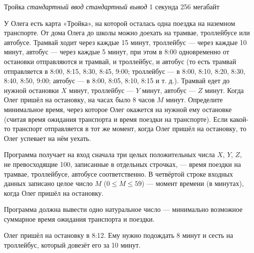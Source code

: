 \begin{problem}%
{Тройка}%
{\textsl{стандартный ввод}}%
{\textsl{стандартный вывод}}%
{1 секунда}%
{256 мегабайт}{}

У Олега есть карта «Тройка», на которой осталась одна поездка на наземном транспорте. От дома Олега до школы можно доехать на трамвае, троллейбусе или автобусе. Трамвай ходит через каждые 15 минут, троллейбус — через каждые 10 минут, автобус — через каждые 5 минут, при этом в 8:00 одновременно от остановки отправляются и трамвай, и троллейбус, и автобус (то есть трамвай отправляется в 8:00, 8:15, 8:30, 8:45, 9:00; троллейбус — в 8:00, 8:10, 8:20, 8:30, 8:40, 8:50, 9:00; автобус — в 8:00, 8:05, 8:10, 8:15 и т. д.). Трамвай едет до нужной остановки $X$ минут, троллейбус — $Y$ минут, автобус — $Z$ минут. Когда Олег пришёл на остановку, на часах было 8 часов $M$ минут. Определите минимальное время, через которое Олег окажется на нужной ему остановке (считая время ожидания транспорта и время поездки на транспорте). Если какой-то транспорт отправляется в тот же момент, когда Олег пришёл на остановку, то Олег успевает на нём уехать.

\InputFile

Программа получает на вход сначала три целых положительных числа $X$, $Y$, $Z$, не превосходящие 100, записанные в отдельных строчках, — время поездки на трамвае, троллейбусе, автобусе соответственно. В четвёртой строке входных данных записано целое число $M$ ($0 \le M \le 59$) — момент времени (в минутах), когда Олег пришёл на остановку.

\OutputFile

Программа должна вывести одно натуральное число — минимально возможное суммарное время ожидания транспорта и поездки.

\Examples

\begin{example}
%
\end{example}

\Explanation

Олег пришёл на остановку в 8:12. Ему нужно подождать 8 минут и сесть на троллейбус, который довезёт его за 10 минут.

\end{problem}
